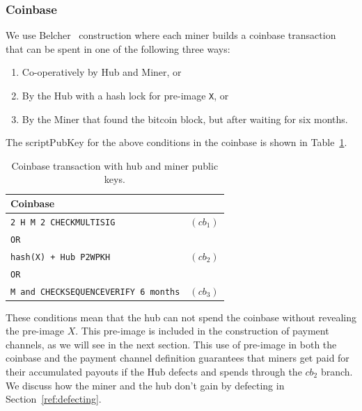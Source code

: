 \documentclass{article}
\begin{document}


\subsubsection{Coinbase}

We use Belcher~\cite{channels-for-rewards} construction where each
miner builds a coinbase transaction that can be spent in one of the
following three ways:

\begin{enumerate}
\item Co-operatively by Hub and Miner, or
\item By the Hub with a hash lock for pre-image \verb|X|, or
\item By the Miner that found the bitcoin block, but after waiting for
  six months.
\end{enumerate}

The scriptPubKey for the above conditions in the coinbase is shown in
Table~\ref{table:coinbase}.

\begin{table}
  \centering
  \begin{tabular}{ lr }
    \bfseries Coinbase \\
    \midrule
    \verb|2 H M 2 CHECKMULTISIG| & $(cb_1)$ \\
    \verb|OR| \\
    \verb|hash(X) + Hub P2WPKH| & $(cb_2)$ \\
    \verb|OR| \\
    \verb|M and CHECKSEQUENCEVERIFY 6 months| & $(cb_3)$\\ 
    \midrule
  \end{tabular}
  \caption{Coinbase transaction with hub and miner public keys.}\label{table:coinbase}
\end{table}

These conditions mean that the hub can not spend the coinbase without
revealing the pre-image $X$. This pre-image is included in the
construction of payment channels, as we will see in the next
section. This use of pre-image in both the coinbase and the payment
channel definition guarantees that miners get paid for their
accumulated payouts if the Hub defects and spends through the $cb_2$
branch. We discuss how the miner and the hub don't gain by defecting
in Section~\ref{ref:defecting}.
\end{document}
